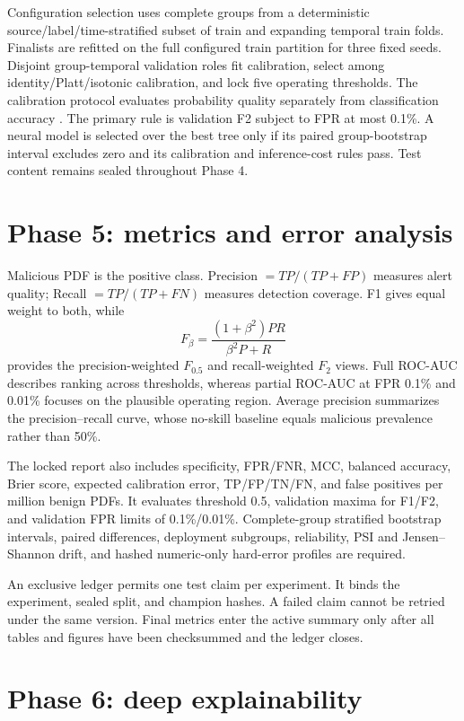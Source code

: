 \documentclass[11pt,a4paper]{article}
\begin{document}
Configuration selection uses complete groups from a deterministic
source/label/time-stratified subset of train and expanding temporal train folds.
Finalists are refitted on the full configured train partition for three fixed
seeds. Disjoint group-temporal validation roles fit calibration, select among
identity/Platt/isotonic calibration, and lock five operating thresholds. The
calibration protocol evaluates probability quality separately from
classification accuracy \cite{guo_calibration}. The
primary rule is validation F2 subject to FPR at most 0.1\%. A neural model is
selected over the best tree only if its paired group-bootstrap interval excludes
zero and its calibration and inference-cost rules pass. Test content remains
sealed throughout Phase 4.

\section{Phase 5: metrics and error analysis}

Malicious PDF is the positive class. Precision $=TP/(TP+FP)$ measures alert
quality; Recall $=TP/(TP+FN)$ measures detection coverage. F1 gives equal weight
to both, while
\[
F_{\beta}=\frac{(1+\beta^2)PR}{\beta^2P+R}
\]
provides the precision-weighted $F_{0.5}$ and recall-weighted $F_2$ views. Full
ROC-AUC describes ranking across thresholds, whereas partial ROC-AUC at FPR
0.1\% and 0.01\% focuses on the plausible operating region. Average precision
summarizes the precision--recall curve, whose no-skill baseline equals malicious
prevalence rather than 50\%.

The locked report also includes specificity, FPR/FNR, MCC, balanced accuracy,
Brier score, expected calibration error, TP/FP/TN/FN, and false positives per
million benign PDFs. It evaluates threshold 0.5, validation maxima for F1/F2,
and validation FPR limits of 0.1\%/0.01\%. Complete-group stratified bootstrap
intervals, paired differences, deployment subgroups, reliability, PSI and
Jensen--Shannon drift, and hashed numeric-only hard-error profiles are required.

An exclusive ledger permits one test claim per experiment. It binds the
experiment, sealed split, and champion hashes. A failed claim cannot be retried
under the same version. Final metrics enter the active summary only after all
tables and figures have been checksummed and the ledger closes.

\section{Phase 6: deep explainability}
\end{document}
